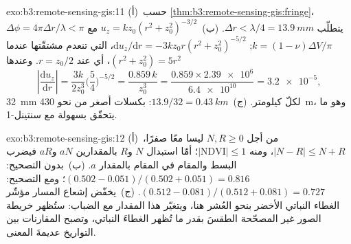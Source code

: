 \begin{solution}{exo:b3:remote-sensing-gis:11}
(أ)~حسب \cref{thm:b3:remote-sensing-gis:fringe}، $\Delta\phi =
4\pi\Delta r/\lambda < \pi$ يتطلّب $\Delta r < \lambda/4 =
\qty{13.9}{mm}$. (ب)~$u_z = k z_0(r^2 + z_0^2)^{-3/2}$ مع $k = (1 -
\nu)\Delta V/\pi$; $\mathrm du_z/\mathrm dr = -3kz_0r(r^2 + z_0^2)^{-5/2}$،
التي تنعدم مشتقّتها عندما $(r^2 + z_0^2) = 5r^2$، أي عند $r = z_0/2$. وعندها
\[
\left|\frac{\mathrm du_z}{\mathrm dr}\right| = \frac{3k}{2z_0^3}\Big(\frac54\Big)^{-5/2}
= \frac{0.859\,k}{z_0^3} = \frac{0.859\times\num{2.39e6}}{\num{6.4e10}} = \num{3.2e-5},
\]
\qty{32}{mm} لكلّ كيلومتر. (ج)~$13.9/32 = \qty{0.43}{km}$: بكسلات أصغر
من نحو \qty{430}{m}، وهو ما يتحقّق بسهولة مع سنتينل-1.
\end{solution}

\begin{solution}{exo:b3:remote-sensing-gis:12}
(أ)~من أجل $N, R \ge 0$ ليسا معًا صفرًا، $|N - R| \le N + R$، ومنه $|\mathrm{NDVI}|
\le 1$؛ أمّا استبدال $N$ و$R$ بالمقدارين $aN$ و$aR$ فيضرب البسط والمقام
في المقام بالمقدار $a$. (ب)~بدون التصحيح: $(0.502 - 0.051)/(0.502 + 0.051) =
0.816$؛ ومع التصحيح: $(0.512 - 0.081)/(0.512 + 0.081) = 0.727$. (ج)~يخفّض إشعاع المسار
مؤشّر الغطاء النباتي الأخضر بنحو العُشر هنا،
ويتغيّر هذا المقدار مع الضباب: ستُظهر خريطة الصور غير المصحّحة
الطقسَ بقدر ما تُظهر الغطاءَ النباتي، وتصبح المقارنات بين التواريخ
عديمةَ المعنى.
\end{solution}

